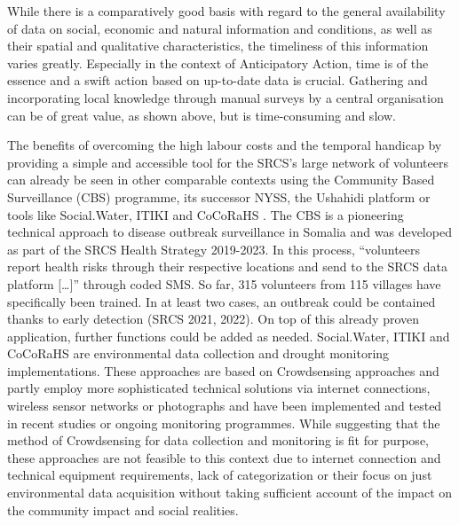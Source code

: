 While there is a comparatively good basis with regard to the general availability of data on social, economic and natural information and conditions, as well as their spatial and qualitative characteristics, the timeliness of this information varies greatly. Especially in the context of Anticipatory Action, time is of the essence and a swift action based on up-to-date data is crucial. Gathering and incorporating local knowledge through manual surveys by a central organisation can be of great value, as shown above, but is time-consuming and slow.

The benefits of overcoming the high labour costs and the temporal handicap by providing a simple and accessible tool for the SRCS’s large network of volunteers can already be seen in other comparable contexts using the Community Based Surveillance (CBS) programme, its successor NYSS, the Ushahidi platform or tools like Social.Water, ITIKI and CoCoRaHS \autocite{fienenSocialWaterCrowdsourcing2012a} . The CBS is a pioneering technical approach to disease outbreak surveillance in Somalia and was developed as part of the SRCS Health Strategy 2019-2023. In this process, “volunteers report health risks through their respective locations and send to the SRCS data platform […]” \autocite[57]{somaliredcrescentsocietyFeasibilityStudyPotential2022} through coded SMS. So far, 315 volunteers from 115 villages have specifically been trained. In at least two cases, an outbreak could be contained thanks to early detection (SRCS 2021, 2022). On top of this already proven application, further functions could be added as needed.
Social.Water, ITIKI and CoCoRaHS are environmental data collection and drought monitoring implementations. These approaches are based on Crowdsensing approaches and partly employ more sophisticated technical solutions via internet connections, wireless sensor networks or photographs and have been implemented and tested in recent studies or ongoing monitoring programmes. While suggesting that the method of Crowdsensing for data collection and monitoring is fit for purpose, these approaches are not feasible to this context due to internet connection and technical equipment requirements, lack of categorization or their focus on just environmental data acquisition without taking sufficient account of the impact on the community impact and social realities.

